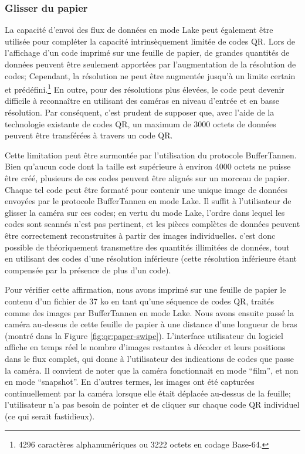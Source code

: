 \subsubsection{Glisser du papier}\label{subsub:swipe}

La capacité d'envoi des flux de données en mode Lake peut également être utilisée pour compléter la capacité intrinsèquement limitée de codes QR. Lors de l'affichage d'un code imprimé sur une feuille de papier, de grandes quantités de données peuvent être seulement apportées par l'augmentation de la résolution de codes; Cependant, la résolution ne peut être augmentée jusqu'à un limite certain et prédéfini.\footnote{4296 caractères alphanumériques ou 3222 octets en codage Base-64.} En outre, pour des résolutions plus élevées, le code peut devenir difficile à reconnaître en utilisant des caméras en niveau d'entrée et en basse résolution. Par conséquent, c'est prudent de supposer que, avec l'aide de la technologie existante de codes QR, un maximum de  3000 octets de données peuvent être transférées à travers un code QR.

Cette limitation peut être surmontée par l'utilisation du protocole BufferTannen. Bien qu'aucun code dont la taille est supérieure à environ 4000 octets ne puisse être créé, plusieurs de ces codes peuvent être alignés sur un morceau de papier. Chaque tel code peut être formaté pour contenir une unique image de données envoyées par le protocole BufferTannen en mode Lake. Il suffit à l'utilisateur de glisser la caméra sur ces codes; en vertu du mode Lake, l'ordre dans lequel les codes sont scannés n'est pas pertinent, et les pièces complètes de données peuvent être correctement reconstruites à partir des images individuelles. c'est donc possible de théoriquement transmettre des quantités illimitées de données, tout en utilisant des codes d'une résolution inférieure (cette résolution inférieure étant compensée par la présence de plus d'un code).

Pour vérifier cette affirmation, nous avons imprimé sur une feuille de papier le contenu d'un fichier de 37 ko en tant qu'une séquence de codes QR, traités comme des images par BufferTannen en mode Lake. Nous avons ensuite passé la caméra au-dessus de cette feuille de papier à une distance d'une longueur de bras (montré dans la Figure \ref{fig:qr:paper-swipe}). L'interface utilisateur du logiciel affiche en temps réel le nombre d'images restantes à décoder et leurs positions dans le flux complet, qui donne à l'utilisateur des indications de codes que passe la caméra. Il convient de noter que la caméra fonctionnait en mode ``film'', et non en mode ``snapshot''. En d'autres termes, les images ont été capturées continuellement par la caméra lorsque elle était déplacée au-dessus de la feuille; l'utilisateur n'a pas besoin de pointer et de cliquer sur chaque code QR individuel (ce qui serait fastidieux).

